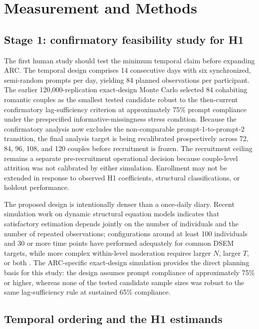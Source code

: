\section{Measurement and Methods}

\subsection{Stage 1: confirmatory feasibility study for H1}

The first human study should test the minimum temporal claim before expanding ARC. The temporal design comprises 14 consecutive days with six synchronized, semi-random prompts per day, yielding 84 planned observations per participant. The earlier 120{,}000-replication exact-design Monte Carlo selected 84 cohabiting romantic couples as the smallest tested candidate robust to the then-current confirmatory lag-sufficiency criterion at approximately 75\% prompt compliance under the prespecified informative-missingness stress condition. Because the confirmatory analysis now excludes the non-comparable prompt-1-to-prompt-2 transition, the final analysis target is being recalibrated prospectively across 72, 84, 96, 108, and 120 couples before recruitment is frozen. The recruitment ceiling remains a separate pre-recruitment operational decision because couple-level attrition was not calibrated by either simulation. Enrollment may not be extended in response to observed H1 coefficients, structural classifications, or holdout performance.

The proposed design is intentionally denser than a once-daily diary. Recent simulation work on dynamic structural equation models indicates that satisfactory estimation depends jointly on the number of individuals and the number of repeated observations; configurations around at least 100 individuals and 30 or more time points have performed adequately for common DSEM targets, while more complex within-level moderation requires larger \(N\), larger \(T\), or both \parencite{mcneish2020dsem,fang2024missing,wang2026dsem,holtmann2025latent}. The ARC-specific exact-design simulation provides the direct planning basis for this study: the design assumes prompt compliance of approximately 75\% or higher, whereas none of the tested candidate sample sizes was robust to the same lag-sufficiency rule at sustained 65\% compliance.

\subsection{Temporal ordering and the H1 estimands}

